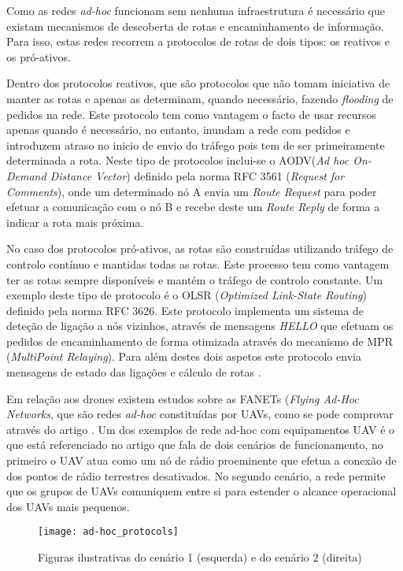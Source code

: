 Como as redes \textit{ad-hoc} funcionam sem nenhuma infraestrutura é necessário que existam mecanismos de descoberta de rotas e encaminhamento de informação. Para isso, estas redes recorrem a protocolos de rotas de dois tipos: os reativos e os pró-ativos.

Dentro dos protocolos reativos, que são protocolos que não tomam iniciativa de manter as rotas e apenas as determinam, quando necessário, fazendo \textit{flooding} de pedidos na rede. Este protocolo tem como vantagem o facto de usar recursos apenas quando é necessário, no entanto, inundam a rede com pedidos e introduzem atraso no inicio de envio do tráfego pois tem de ser primeiramente determinada a rota. Neste tipo de protocolos inclui-se o AODV(\textit{Ad hoc On-Demand Distance Vector}) definido pela norma RFC 3561 (\textit{Request for Comments}), onde um determinado nó A envia um \textit{Route Request} para poder efetuar a comunicação com o nó B e recebe deste um \textit{Route Reply} de forma a indicar a rota mais próxima.

No caso dos protocolos pró-ativos, as rotas são construídas utilizando tráfego de controlo contínuo e mantidas todas as rotas. Este processo tem como vantagem ter as rotas sempre disponíveis e mantém o tráfego de controlo constante. Um exemplo deste tipo de protocolo é o OLSR (\textit{Optimized Link-State Routing}) definido pela norma RFC 3626. Este protocolo implementa um sistema de deteção de ligação a nós vizinhos, através de mensagens \textit{HELLO} que efetuam os pedidos de encaminhamento de forma otimizada através do mecanismo de MPR (\textit{MultiPoint Relaying}). Para além destes dois aspetos este protocolo envia mensagens de estado das ligações e cálculo de rotas \cite{Ricardoa}.

Em relação aos drones existem estudos sobre as FANETs (\textit{Flying Ad-Hoc Networks}, que são redes \textit{ad-hoc} constituídas por UAVs, como se pode comprovar através do artigo \cite{Bekmezci2013a}. Um dos exemplos de rede ad-hoc com equipamentos UAV é o que está referenciado no artigo \cite{Brown2004} que fala de dois cenários de funcionamento, no primeiro o UAV atua como um nó de rádio proeminente que efetua a conexão de dos pontos de rádio terrestres desativados. No segundo cenário, a rede permite que os grupos de UAVs comuniquem entre si para estender o alcance operacional dos UAVs mais pequenos.

\begin{figure}[H]
\centering
\texttt{[image: ad-hoc\_protocols]}
\caption{Figuras ilustrativas do cenário 1 (esquerda) e do cenário 2 (direita)  \label{fig:ad-hoc_protocols}}
\cite{Ricardoa}
\end{figure}

